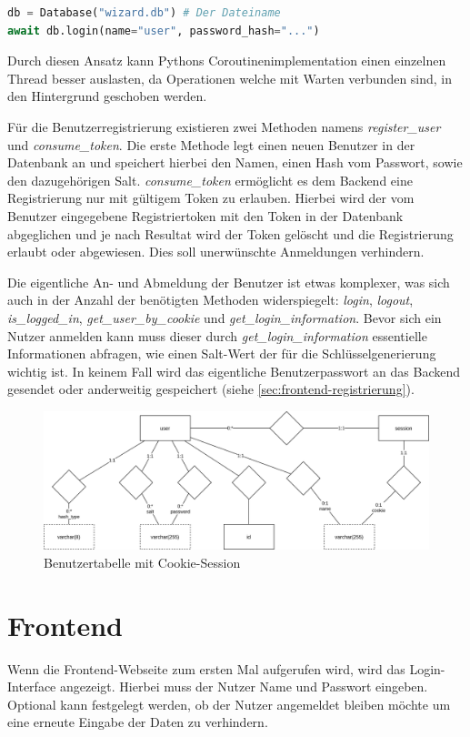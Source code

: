 \begin{lstlisting}[language=Python]
db = Database("wizard.db") # Der Dateiname
await db.login(name="user", password_hash="...")
\end{lstlisting}

Durch diesen Ansatz kann Pythons Coroutinenimplementation einen einzelnen Thread besser auslasten, da Operationen welche mit Warten verbunden sind, in den Hintergrund geschoben werden.

Für die Benutzerregistrierung existieren zwei Methoden namens \textit{register\_user} und \textit{consume\_token}. Die erste Methode legt einen neuen Benutzer in der Datenbank an und speichert hierbei den Namen, einen Hash vom Passwort, sowie den dazugehörigen Salt. \textit{consume\_token} ermöglicht es dem Backend eine Registrierung nur mit gültigem Token zu erlauben. Hierbei wird der vom Benutzer eingegebene Registriertoken mit den Token in der Datenbank abgeglichen und je nach Resultat wird der Token gelöscht und die Registrierung erlaubt oder abgewiesen. Dies soll unerwünschte Anmeldungen verhindern.

Die eigentliche An- und Abmeldung der Benutzer ist etwas komplexer, was sich auch in der Anzahl der benötigten Methoden widerspiegelt: \textit{login}, \textit{logout}, \textit{is\_logged\_in}, \textit{get\_user\_by\_cookie} und \textit{get\_login\_information}. Bevor sich ein Nutzer anmelden kann muss dieser durch \textit{get\_login\_information} essentielle Informationen abfragen, wie einen Salt-Wert der für die Schlüsselgenerierung wichtig ist. In keinem Fall wird das eigentliche Benutzerpasswort an das Backend gesendet oder anderweitig gespeichert (siehe \cref{sec:frontend-registrierung}).

\begin{figure}[h]
	\includegraphics[width=\textwidth]{images/user-db.png}
	\caption{Benutzertabelle mit Cookie-Session}
\end{figure}

\section{Frontend}
Wenn die Frontend-Webseite zum ersten Mal aufgerufen wird, wird das Login-Interface angezeigt. Hierbei muss der Nutzer Name und Passwort eingeben. Optional kann festgelegt werden, ob der Nutzer angemeldet bleiben möchte um eine erneute Eingabe der Daten zu verhindern.

